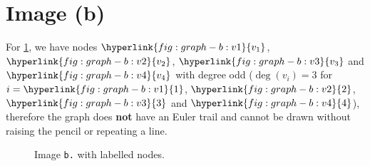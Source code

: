 \section{Image (b)}

\noindent
\begin{minipage}[t]{0.49\textwidth}

    For \cref{fig:graph-b}, we have nodes $\hyperlink{fig:graph-b:v1}{v_1}$, $\hyperlink{fig:graph-b:v2}{v_2}$, $\hyperlink{fig:graph-b:v3}{v_3}$ and $\hyperlink{fig:graph-b:v4}{v_4}$ with degree odd ($\deg(v_i) = 3$ for $i = \hyperlink{fig:graph-b:v1}{1}$, $\hyperlink{fig:graph-b:v2}{2}$, $\hyperlink{fig:graph-b:v3}{3}$ and $\hyperlink{fig:graph-b:v4}{4}$), therefore the graph does \textbf{not} have an Euler trail and cannot be drawn without raising the pencil or repeating a line.

\end{minipage}%
\begin{minipage}[t]{0.5\textwidth}

    \begin{figure}[H]
        \centering
        

        \caption{Image \texttt{b.} with labelled nodes.}
        \label{fig:graph-b}
    \end{figure}

\end{minipage}
